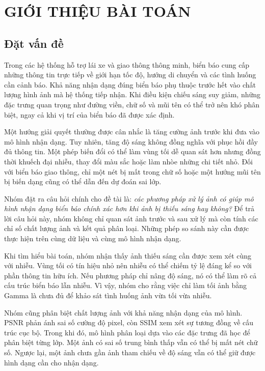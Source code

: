\section{GIỚI THIỆU BÀI TOÁN}
\subsection{Đặt vấn đề}
Trong các hệ thống hỗ trợ lái xe và giao thông thông minh, biển báo cung cấp những thông tin trực tiếp về giới hạn tốc độ, hướng di chuyển và các tình huống cần cảnh báo. Khả năng nhận dạng đúng biển báo phụ thuộc trước hết vào chất lượng hình ảnh mà hệ thống tiếp nhận. Khi điều kiện chiếu sáng suy giảm, những đặc trưng quan trọng như đường viền, chữ số và mũi tên có thể trở nên khó phân biệt, ngay cả khi vị trí của biển báo đã được xác định.

Một hướng giải quyết thường được cân nhắc là tăng cường ảnh trước khi đưa vào mô hình nhận dạng. Tuy nhiên, tăng độ sáng không đồng nghĩa với phục hồi đầy đủ thông tin. Một phép biến đổi có thể làm vùng tối dễ quan sát hơn nhưng đồng thời khuếch đại nhiễu, thay đổi màu sắc hoặc làm nhòe những chi tiết nhỏ. Đối với biển báo giao thông, chỉ một nét bị mất trong chữ số hoặc một hướng mũi tên bị biến dạng cũng có thể dẫn đến dự đoán sai lớp.

Nhóm đặt ra câu hỏi chính cho đề tài là: \textit{các phương pháp xử lý ảnh có giúp mô hình nhận dạng biển báo chính xác hơn khi ảnh bị thiếu sáng hay không?} Để trả lời câu hỏi này, nhóm không chỉ quan sát ảnh trước và sau xử lý mà còn tính các chỉ số chất lượng ảnh và kết quả phân loại. Những phép so sánh này cần được thực hiện trên cùng dữ liệu và cùng mô hình nhận dạng.

Khi tìm hiểu bài toán, nhóm nhận thấy ảnh thiếu sáng cần được xem xét cùng với nhiễu. Vùng tối có tín hiệu nhỏ nên nhiễu có thể chiếm tỷ lệ đáng kể so với phần thông tin hữu ích. Nếu phương pháp chỉ nâng độ sáng, nó có thể làm rõ cả cấu trúc biển báo lẫn nhiễu. Vì vậy, nhóm cho rằng việc chỉ làm tối ảnh bằng Gamma là chưa đủ để khảo sát tình huống ảnh vừa tối vừa nhiễu.

Nhóm cũng phân biệt chất lượng ảnh với khả năng nhận dạng của mô hình. PSNR phản ánh sai số cường độ pixel, còn SSIM xem xét sự tương đồng về cấu trúc cục bộ. Trong khi đó, mô hình phân loại dựa vào các đặc trưng đã học để phân biệt từng lớp. Một ảnh có sai số trung bình thấp vẫn có thể bị mất nét chữ số. Ngược lại, một ảnh chưa gần ảnh tham chiếu về độ sáng vẫn có thể giữ được hình dạng cần cho nhận dạng.


